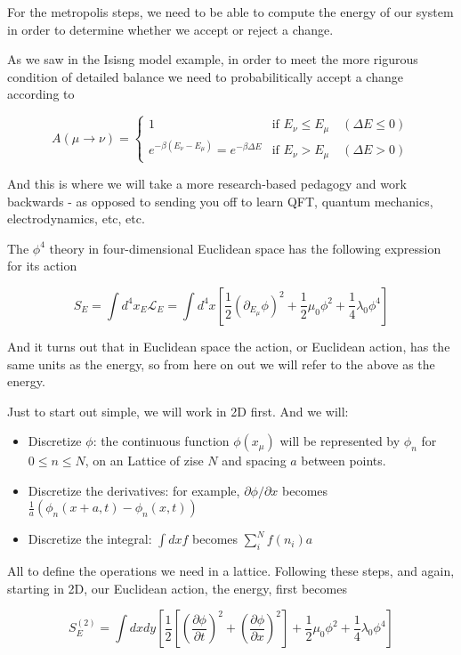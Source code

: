 For the metropolis steps, we need to be able to compute the energy of our system in order to determine whether we
accept or reject a change.

As we saw in the Isisng model example, in order to meet the more rigurous condition of detailed balance we need to
probabilitically accept a change according to

$$
A(\mu \rightarrow \nu)
=
\begin{cases}
1           & \text{if } E_\nu \leq E_\mu \quad(\Delta E \leq 0) \\
e^{-\beta (E_\nu - E_\mu)} = e^{-\beta \Delta E}   & \text{if } E_\nu > E_\mu \quad(\Delta E > 0)
\end{cases}
$$

And this is where we will take a more research-based pedagogy and work backwards - as opposed to sending you off
to learn QFT, quantum mechanics, electrodynamics, etc, etc.

The $\phi^4$ theory in four-dimensional Euclidean space has the following expression for its action

$$
S_{E} = 
\int d^4 x_E \mathcal{L}_{E} =
\int d^4 x \left[ 
    \frac{1}{2} \left( \partial_{E_\mu} \phi \right)^2 + \frac{1}{2} \mu_0 \phi^2 + \frac{1}{4} \lambda_0 \phi^4
\right]
$$

And it turns out that in Euclidean space the action, or Euclidean action, has the same units as the energy,
so from here on out we will refer to the above as the energy.

Just to start out simple, we will work in 2D first.
And we will:

\begin{itemize}
\item Discretize $\phi$: the continuous function $\phi(x_\mu)$ will be represented by $\phi_n$ for $0 \leq n \leq N$,
    on an Lattice of zise $N$ and spacing $a$ between points.
\item Discretize the derivatives: for example, $\partial \phi / \partial x$ becomes
    $\frac{1}{a} \left( \phi_n(x+a,t) - \phi_n(x,t) \right)$
\item Discretize the integral: $\int dx f$ becomes $\sum^{N}_{i} f(n_i) a$
\end{itemize}

All to define the operations we need in a lattice.
Following these steps, and again, starting in 2D, our Euclidean action, the energy, first becomes

$$
S_{E}^{(2)} = 
\int dx dy
\left[ 
    \frac{1}{2} \left[ \left( \frac{\partial \phi}{\partial t} \right)^2 +  \left( \frac{\partial \phi}{\partial x} \right)^2 \right] 
    + \frac{1}{2} \mu_0 \phi^2 + \frac{1}{4} \lambda_0 \phi^4
\right]
$$

